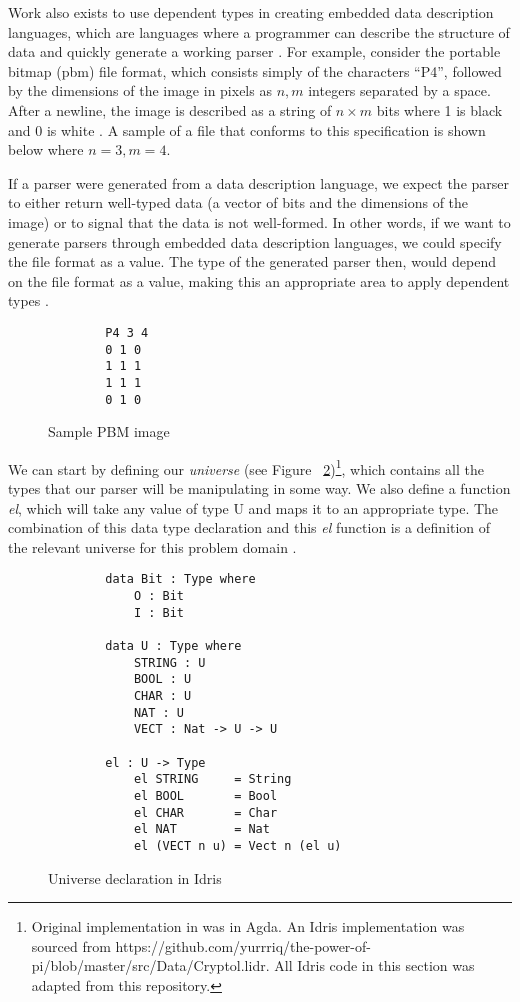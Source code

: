 Work also exists to use dependent types in creating embedded data description
languages, which are languages where a programmer can describe the structure of
data and quickly generate a working parser \cite{power_of_pi}.  For example,
consider the portable bitmap (pbm) file format, which consists simply of the
characters ``P4'', followed by the dimensions of the image in pixels as $n, m$
integers separated by a space. After a newline, the image is described as a
string of $n\times m $ bits where 1 is black and 0 is white \cite{pmb_spec}. A
sample of a file that conforms to this specification is shown below where $n=3,
m=4$. 

If a parser were generated from a data description language, we expect the
parser to either return well-typed data (a vector of bits and the dimensions of
the image) or to signal that the data is not well-formed. In other words, if we
want to generate parsers through embedded data description languages, we could
specify the file format as a value. The type of the generated parser then, would
depend on the file format as a value, making this an appropriate area to apply
dependent types \cite{power_of_pi}. 

\begin{figure}[h]
    \centering
    \caption{Sample PBM image}
    \label{pbm_sample}
    \begin{lstlisting}
        P4 3 4
        0 1 0
        1 1 1
        1 1 1
        0 1 0
    \end{lstlisting}
\end{figure}

We can start by defining our \textit{universe} (see Figure
~\ref{universe})\footnote{\label{idris_source}Original implementation in
\cite{power_of_pi} was in Agda. An Idris implementation was sourced from
https://github.com/yurrriq/the-power-of-pi/blob/master/src/Data/Cryptol.lidr.
All Idris code in this section was adapted from this repository.}, which
contains all the types that our parser will be manipulating in some way. We also
define a function \textit{el}, which will take any value of type U and maps it
to an appropriate type. The combination of this data type declaration and this
\textit{el} function is a definition of the relevant universe for this problem
domain \cite{power_of_pi}. 

\begin{figure}[h]
    \caption{Universe declaration in Idris \protect\cite{power_of_pi}}
    \label{universe}
    \begin{lstlisting}
        data Bit : Type where 
            O : Bit 
            I : Bit

        data U : Type where
            STRING : U
            BOOL : U
            CHAR : U
            NAT : U
            VECT : Nat -> U -> U
        
        el : U -> Type
            el STRING     = String
            el BOOL       = Bool
            el CHAR       = Char
            el NAT        = Nat
            el (VECT n u) = Vect n (el u)
    \end{lstlisting}
\end{figure}

